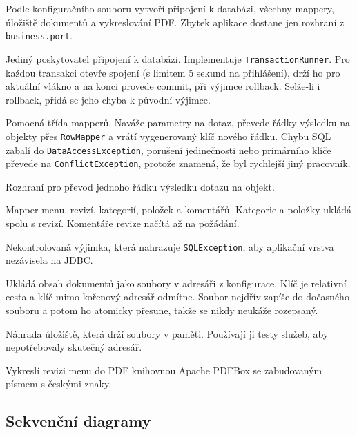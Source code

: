 \begin{description}[itemsep=2pt,style=unboxed]
  \item[\texttt{DataAccessFactory}] Podle konfiguračního souboru vytvoří připojení k databázi, všechny mappery, úložiště dokumentů a vykreslování PDF. Zbytek aplikace dostane jen rozhraní z \texttt{business.port}.
  \item[\texttt{Database}] Jediný poskytovatel připojení k databázi. Implementuje \texttt{TransactionRunner}. Pro každou transakci otevře spojení (s limitem 5 sekund na přihlášení), drží ho pro aktuální vlákno a na konci provede commit, při výjimce rollback. Selže-li i rollback, přidá se jeho chyba k původní výjimce.
  \item[\texttt{Jdbc}] Pomocná třída mapperů. Naváže parametry na dotaz, převede řádky výsledku na objekty přes \texttt{RowMapper} a vrátí vygenerovaný klíč nového řádku. Chybu SQL zabalí do \texttt{DataAccessException}, porušení jedinečnosti nebo primárního klíče převede na \texttt{ConflictException}, protože znamená, že byl rychlejší jiný pracovník.
  \item[\texttt{Jdbc.RowMapper}] Rozhraní pro převod jednoho řádku výsledku dotazu na objekt.
  \item[\texttt{OracleMenuMapper}] Mapper menu, revizí, kategorií, položek a komentářů. Kategorie a položky ukládá spolu s revizí. Komentáře revize načítá až na požádání.
  \item[\texttt{DataAccessException}] Nekontrolovaná výjimka, která nahrazuje \texttt{SQLException}, aby aplikační vrstva nezávisela na JDBC.
  \item[\texttt{FileDocumentStorage}] Ukládá obsah dokumentů jako soubory v adresáři z konfigurace. Klíč je relativní cesta a klíč mimo kořenový adresář odmítne. Soubor nejdřív zapíše do dočasného souboru a potom ho atomicky přesune, takže se nikdy neukáže rozepsaný.
  \item[\texttt{InMemoryDocumentStorage}] Náhrada úložiště, která drží soubory v paměti. Používají ji testy služeb, aby nepotřebovaly skutečný adresář.
  \item[\texttt{PdfMenuRenderer}] Vykreslí revizi menu do PDF knihovnou Apache PDFBox se zabudovaným písmem s českými znaky.
\end{description}

\subsection{Sekvenční diagramy}\label{sec:a5:seq}

